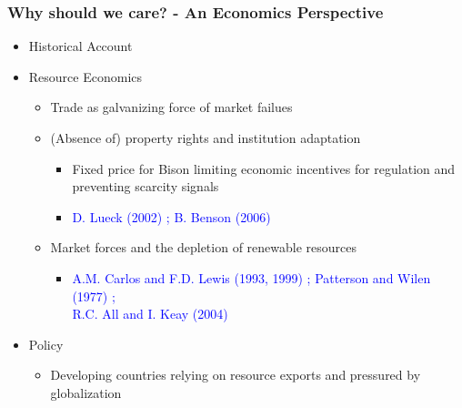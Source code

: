 \documentclass[aspectratio=169, 12pt, final]{beamer}
\begin{document}
\begin{frame}
\frametitle{Why should we care? - An Economics Perspective}	
\begin{itemize}
	\item Historical Account
	\item Resource Economics
	\begin{itemize}
		\item Trade as galvanizing force of market failues
		\item (Absence of) property rights and institution adaptation
		\begin{itemize}
			\item Fixed price for Bison limiting economic incentives for regulation and preventing scarcity signals
			\item \textcolor{blue}{D. Lueck (2002) ; B. Benson (2006)}
		\end{itemize}
		\item Market forces and the depletion of renewable resources
		\begin{itemize}
			\item \textcolor{blue}{A.M. Carlos and F.D. Lewis (1993, 1999) ; Patterson and Wilen (1977) ; \\R.C. All and I. Keay (2004)}
		\end{itemize}
	\end{itemize}
	\item Policy
	\begin{itemize}
		\item Developing countries relying on resource exports and pressured by globalization
	\end{itemize}
\end{itemize}
\end{frame}



\end{document}
